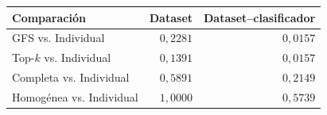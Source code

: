\begin{resulttable}
\centering\fontsize{8.5}{10.5}\selectfont\setlength{\tabcolsep}{4pt}
\caption{Comparaciones frente a Individual: p-values ajustados mediante Holm bajo las dos formas de agregación.}
\label{tab:vs-individual-comparison}
\begin{tabular}{@{}lrr@{}}
\toprule
Comparación & Dataset & Dataset--clasificador \\
\midrule
GFS vs. Individual & $0{,}2281$ & $0{,}0157$ \\
Top-$k$ vs. Individual & $0{,}1391$ & $0{,}0157$ \\
Completa vs. Individual & $0{,}5891$ & $0{,}2149$ \\
Homogénea vs. Individual & $1{,}0000$ & $0{,}5739$ \\
\bottomrule
\end{tabular}
\par{}
\end{resulttable}
\FloatBarrier
